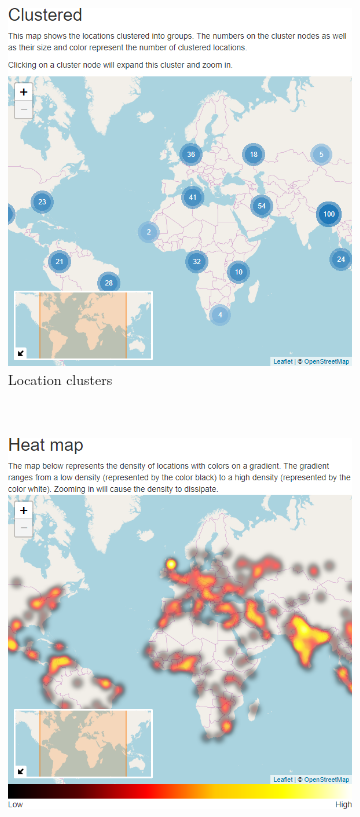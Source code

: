\begin{figure}
	\centering
	\begin{subfigure}[b]{0.315\linewidth}
		\includegraphics[width=1\linewidth]{img/features/locations-clustered.png}
		\caption{Location clusters}
		\label{fig:features:locations-clustered}
	\end{subfigure}
	~
	\begin{subfigure}[b]{0.315\linewidth}
		\includegraphics[width=1\linewidth]{img/features/locations-heatmapped.png}

\end{subfigure}
\end{figure}
